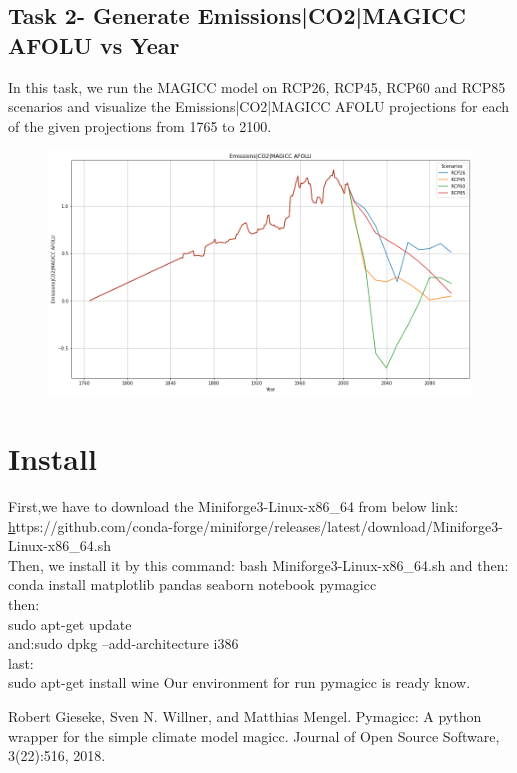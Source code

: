 \documentclass{article}
\begin{document}
\clearpage
\subsection{Task 2- Generate Emissions|CO2|MAGICC AFOLU vs Year}
In this task, we run the MAGICC model on RCP26, RCP45, RCP60 and RCP85 scenarios and
visualize the Emissions|CO2|MAGICC AFOLU projections for each of the given projections from
1765 to 2100.
\begin{figure}[h]
\includegraphics[width=\textwidth,height=\textheight,keepaspectratio]{Emmissions.png}
\end{figure}
\section{Install}
First,we have to download the Miniforge3-Linux-x86\_64 from below link:\\
\href{https://github.com/conda-forge/miniforge/releases/latest/download/Miniforge3-Linux-x86_64.sh}https://github.com/conda-forge/miniforge/releases/latest/download/Miniforge3-Linux-x86\_64.sh\\
Then, we install it by this command: bash Miniforge3-Linux-x86\_64.sh  and then:\\
conda install matplotlib pandas seaborn notebook pymagicc\\
then:\\
sudo apt-get update \\
and:sudo dpkg --add-architecture i386\\
 last:\\
 sudo apt-get install wine
 Our environment for run pymagicc is ready know.\\
\begin{thebibliography}{9}
Robert Gieseke, Sven N. Willner, and Matthias Mengel. Pymagicc: A python wrapper for the
simple climate model magicc. Journal of Open Source Software, 3(22):516, 2018.
\end{thebibliography}
\end{document}
